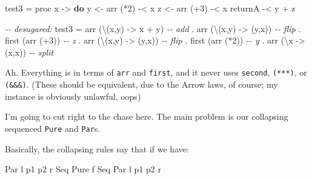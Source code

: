 \documentclass[]{article}
\newenvironment{Shaded}{}{}
\newcommand{\CommentTok}[1]{\textcolor[rgb]{0.38,0.63,0.69}{\textit{#1}}}
\newcommand{\DataTypeTok}[1]{\textcolor[rgb]{0.56,0.13,0.00}{#1}}
\newcommand{\DecValTok}[1]{\textcolor[rgb]{0.25,0.63,0.44}{#1}}
\newcommand{\KeywordTok}[1]{\textcolor[rgb]{0.00,0.44,0.13}{\textbf{#1}}}
\newcommand{\NormalTok}[1]{#1}
\newcommand{\OperatorTok}[1]{\textcolor[rgb]{0.40,0.40,0.40}{#1}}
\newcommand{\OtherTok}[1]{\textcolor[rgb]{0.00,0.44,0.13}{#1}}
\begin{document}
\begin{Shaded}
\begin{Highlighting}[]
\NormalTok{test3 }\OtherTok{=}\NormalTok{ proc x }\OtherTok{{-}\textgreater{}} \KeywordTok{do}
\NormalTok{    y }\OtherTok{\textless{}{-}}\NormalTok{ arr (}\OperatorTok{*}\DecValTok{2}\NormalTok{) }\OperatorTok{{-}\textless{}}\NormalTok{ x}
\NormalTok{    z }\OtherTok{\textless{}{-}}\NormalTok{ arr (}\OperatorTok{+}\DecValTok{3}\NormalTok{) }\OperatorTok{{-}\textless{}}\NormalTok{ x}
\NormalTok{    returnA }\OperatorTok{{-}\textless{}}\NormalTok{ y }\OperatorTok{+}\NormalTok{ z}

\CommentTok{{-}{-} desugared:}
\NormalTok{test3\textquotesingle{} }\OtherTok{=}\NormalTok{ arr (\textbackslash{}(x,y) }\OtherTok{{-}\textgreater{}}\NormalTok{ x }\OperatorTok{+}\NormalTok{ y)     }\CommentTok{{-}{-} add}
       \OperatorTok{.}\NormalTok{ arr (\textbackslash{}(x,y) }\OtherTok{{-}\textgreater{}}\NormalTok{ (y,x))     }\CommentTok{{-}{-} flip}
       \OperatorTok{.}\NormalTok{ first (arr (}\OperatorTok{+}\DecValTok{3}\NormalTok{))          }\CommentTok{{-}{-} z}
       \OperatorTok{.}\NormalTok{ arr (\textbackslash{}(x,y) }\OtherTok{{-}\textgreater{}}\NormalTok{ (y,x))     }\CommentTok{{-}{-} flip}
       \OperatorTok{.}\NormalTok{ first (arr (}\OperatorTok{*}\DecValTok{2}\NormalTok{))          }\CommentTok{{-}{-} y}
       \OperatorTok{.}\NormalTok{ arr (\textbackslash{}x }\OtherTok{{-}\textgreater{}}\NormalTok{ (x,x))         }\CommentTok{{-}{-} split}
\end{Highlighting}
\end{Shaded}

Ah. Everything is in terms of \texttt{arr} and \texttt{first}, and it never uses
\texttt{second}, \texttt{(***)}, or \texttt{(\&\&\&)}. (These should be
equivalent, due to the Arrow laws, of course; my instance is obviously unlawful,
oops)

I'm going to cut right to the chase here. The main problem is our collapsing
sequenced \texttt{Pure} and \texttt{Par}s.

Basically, the collapsing rules say that if we have:

\begin{Shaded}
\begin{Highlighting}[]
\DataTypeTok{Par}\NormalTok{ l p1 p2 r }\OtherTok{\textasciigrave{}Seq\textasciigrave{}} \DataTypeTok{Pure}\NormalTok{ f }\OtherTok{\textasciigrave{}Seq\textasciigrave{}} \DataTypeTok{Par}\NormalTok{ l\textquotesingle{} p1\textquotesingle{} p2\textquotesingle{} r\textquotesingle{}}
\end{Highlighting}
\end{Shaded}
\end{document}
